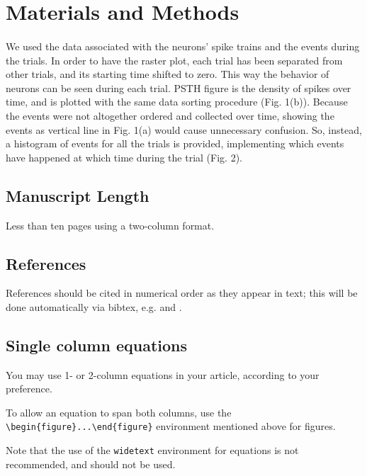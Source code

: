 \documentclass[9pt,twocolumn]{paper-template}
\begin{document}
\section*{Materials and Methods}
\paragraph*{}
We used the data associated with the neurons' spike trains and the events during the trials. In order to have the raster plot, each trial has been separated from other trials, and its starting time shifted to zero. This way the behavior of neurons can be seen during each trial. PSTH figure is the density of spikes over time, and is plotted with the same data sorting procedure (Fig. 1(b)). Because the events were not altogether ordered and collected over time, showing the events as vertical line in Fig. 1(a) would cause unnecessary confusion. So, instead, a histogram of events for all the trials is provided, implementing which events have happened at which time during the trial (Fig. 2).

\subsection*{Manuscript Length}
Less than ten pages using a two-column format.

\subsection*{References}
References should be cited in numerical order as they appear in text; this will be done automatically via bibtex, e.g. \cite{first} and \cite{dataset,third}.

\subsection*{Single column equations}

You may use 1- or 2-column equations in your article, according to your preference.

To allow an equation to span both columns, use the \verb|\begin{figure}...\end{figure}| environment mentioned above for figures.

Note that the use of the \verb|widetext| environment for equations is not recommended, and should not be used.
\end{document}
